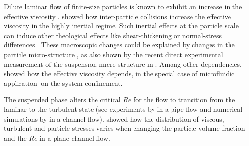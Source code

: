 \documentclass{jfm}
\begin{document}
Dilute laminar flow of finite-size particles is known to exhibit an increase in the effective viscosity \citep{guazzelli2011physical}. \citet{bagnold1954experiments} showed how inter-particle collisions increase the effective viscosity in the highly inertial regime. Such inertial effects at the particle scale can induce other rheological effects like shear-thickening \citep{picano2013shear} or normal-stress differences \citep{kulkarni2008suspension, yeo2013dynamics}. These macroscopic changes could be explained by changes in the particle micro-structure \citep{morris2009review}, as also shown by the recent direct experimental measurement of the suspension micro-structure in \citet{blanc2013microstructure}. Among other dependencies,  \citet{fornari2016effect} showed how the effective viscosity depends, in the special case of microfluidic application, on the system confinement.

The suspended phase alters the critical $Re$ for the flow to transition from the laminar to the turbulent state (see experiments by \citet{matas2003transition} in a pipe flow and numerical simulations by \citet{loisel2013effect} in a channel flow). \citet{lashgari2014laminar} showed how the distribution of viscous, turbulent and particle stresses \citep{batchelor1970stress} varies when changing the particle volume fraction and the $Re$ in a plane channel flow.
\end{document}
